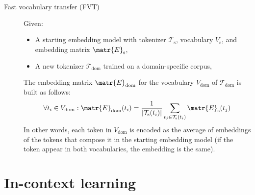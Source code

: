 \begin{description}
        \begin{description}
            \item[Fast vocabulary transfer (FVT)] 
                Given:
                \begin{itemize}
                    \item A starting embedding model with tokenizer $\mathcal{T}_\text{s}$, vocabulary $V_\text{s}$, and embedding matrix $\matr{E}_\text{s}$,
                    \item A new tokenizer $\mathcal{T}_\text{dom}$ trained on a domain-specific corpus,
                \end{itemize}
                The embedding matrix $\matr{E}_\text{dom}$ for the vocabulary $V_\text{dom}$ of $\mathcal{T}_\text{dom}$ is built as follows:
                \[ 
                    \forall t_i \in V_\text{dom}: \matr{E}_\text{dom}(t_i) = \frac{1}{|\mathcal{T}_\text{s}(t_i)|} \sum_{t_j \in \mathcal{T}_\text{s}(t_i)}\matr{E}_\text{s}(t_j)
                \]
                In other words, each token in $V_\text{dom}$ is encoded as the average of embeddings of the tokens that compose it in the starting embedding model (if the token appear in both vocabularies, the embedding is the same).
        \end{description}
\end{description}



\section{In-context learning}


